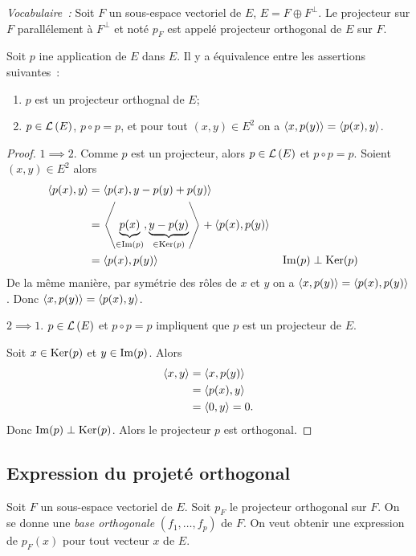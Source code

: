 \emph{Vocabulaire~:} Soit $F$ un sous-espace vectoriel de $E$, $E = F \oplus F^\perp$. Le projecteur sur $F$ parallélement à $F^\perp$ et noté $p_F$ est appelé projecteur orthogonal de $E$ sur $F$.

\begin{theo}
  Soit $p$ ine application de $E$ dans $E$. Il y a équivalence entre les assertions suivantes~:
  \begin{enumerate}
  \item $p$ est un projecteur orthognal de $E$;
  \item $p \in \mathcal{L}\left(E\right)$, $p \circ p =p$, et pour tout $(x,y) \in E^2$ on a $\left\langle{x},{p(y)}\right\rangle=\left\langle{p(x)},{y}\right\rangle$.
  \end{enumerate}
\end{theo}
\begin{proof}
  $1 \implies 2$. Comme $p$ est un projecteur, alors $p \in \mathcal{L}\left(E\right)$ et $p \circ p =p$. Soient $(x,y) \in E^2$ alors
  \begin{align}
    \left\langle{p(x)},{y}\right\rangle &=  \left\langle{p(x)},{y-p(y)+p(y)}\right\rangle \\
    &= \left\langle{\underbrace{p(x)}_{\in \operatorname{Im}(p)}},{\underbrace{y-p(y)}_{\in \operatorname{Ker}(p)}}\right\rangle+\left\langle{p(x)},{p(y)}\right\rangle \\
    &=  \left\langle{p(x)},{p(y)}\right\rangle && \operatorname{Im}(p) \perp \operatorname{Ker}(p)
  \end{align}
  De la même manière, par symétrie des rôles de $x$ et $y$ on a $\left\langle{x},{p(y)}\right\rangle=\left\langle{p(x)},{p(y)}\right\rangle$. Donc $\left\langle{x},{p(y)}\right\rangle=\left\langle{p(x)},{y}\right\rangle$.

  $2 \implies 1$. $p \in \mathcal{L}\left(E\right)$ et $p \circ p =p$ impliquent que $p$ est un projecteur de $E$.

  Soit $x \in \operatorname{Ker}(p)$ et $y \in \operatorname{Im}(p)$. Alors
  \begin{align}
    \left\langle{x},{y}\right\rangle &= \left\langle{x},{p(y)}\right\rangle \\
    &=\left\langle{p(x)},{y}\right\rangle \\
    &=\left\langle{0},{y}\right\rangle=0.
  \end{align}
  Donc $\operatorname{Im}(p) \perp \operatorname{Ker}(p)$. Alors le projecteur $p$ est orthogonal.
\end{proof}

\subsection{Expression du projeté orthogonal}

Soit $F$ un sous-espace vectoriel de $E$. Soit $p_F$ le projecteur orthogonal sur $F$. On se donne une \emph{base orthogonale} $(f_1, \ldots, f_p)$ de $F$. On veut obtenir une expression de $p_F(x)$ pour tout vecteur $x$ de $E$.

